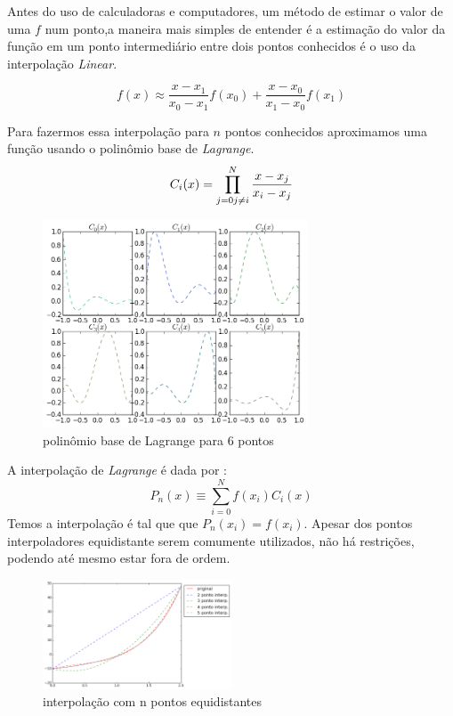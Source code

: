  Antes do uso de calculadoras e computadores, um método de estimar o valor de uma $f$ num ponto,a   maneira mais simples de entender é a estimação do valor da função em um ponto intermediário entre dois pontos conhecidos é o uso da interpolação \emph{Linear}.

\begin{equation}
	f(x) \approx \frac{x - x_1}{x_0 - x_1}f(x_0)  + \frac{x - x_0}{x_1 - x_0}f(x_1)
\end{equation} 
 
 Para fazermos essa interpolação para $n$ pontos conhecidos aproximamos uma função usando o polinômio base de \emph{Lagrange}.
\begin{equation}
C_i(x) = \prod_{j = 0 \\ j \neq i}^{N} \frac{x - x_j}{x_i - x_j} 
\end{equation} 

\begin{figure}[!h]
\includegraphics[width=0.7\textwidth, center ]{figuras/exemplo_polinomio_lagrange.png}
\caption{polinômio base de Lagrange para 6 pontos}
\end{figure}

 A interpolação de \emph{Lagrange} é dada por :
\begin{equation}
 P_n(x) \equiv \sum_{i = 0}^{N} f(x_i)C_i(x) 
\end{equation}    
 Temos a interpolação é tal que que $P_n(x_i) = f(x_i)$. Apesar dos pontos interpoladores equidistante serem comumente utilizados, não há restrições, podendo até mesmo estar fora de ordem.
\begin{figure}[h]
  \includegraphics[width=0.5\textwidth, center]{figuras/interpolacao_linear5.png}
  \caption{interpolação com n pontos equidistantes}
\end{figure}

